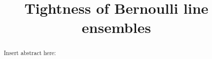 \documentclass[11pt,letterpaper]{amsart}
\title{Tightness of Bernoulli line ensembles}
\numberwithin{equation}{section}
\begin{document}
\maketitle

\begin{abstract}
Insert abstract here:
\end{abstract}



\tableofcontents










\end{document}
